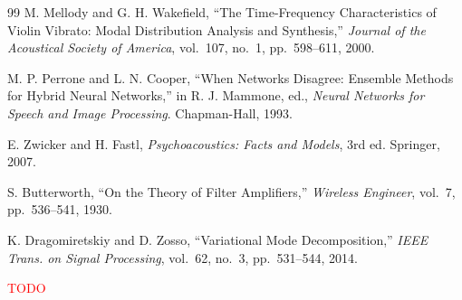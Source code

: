 \documentclass[a4paper, UTF8, zihao=-4, fontset=fandol]{ctexart}
\begin{document}
\begin{thebibliography}{99}
 M. Mellody and G. H. Wakefield, ``The Time-Frequency Characteristics of Violin Vibrato: Modal Distribution Analysis and Synthesis,'' \emph{Journal of the Acoustical Society of America}, vol.~107, no.~1, pp.~598--611, 2000.

 M. P. Perrone and L. N. Cooper, ``When Networks Disagree: Ensemble Methods for Hybrid Neural Networks,'' in R. J. Mammone, ed., \emph{Neural Networks for Speech and Image Processing}. Chapman-Hall, 1993.

 E. Zwicker and H. Fastl, \emph{Psychoacoustics: Facts and Models}, 3rd ed. Springer, 2007.

 S. Butterworth, ``On the Theory of Filter Amplifiers,'' \emph{Wireless Engineer}, vol.~7, pp.~536--541, 1930.

 K. Dragomiretskiy and D. Zosso, ``Variational Mode Decomposition,'' \emph{IEEE Trans. on Signal Processing}, vol.~62, no.~3, pp.~531--544, 2014.

\textcolor{red}{TODO}
\end{thebibliography}
\end{document}
